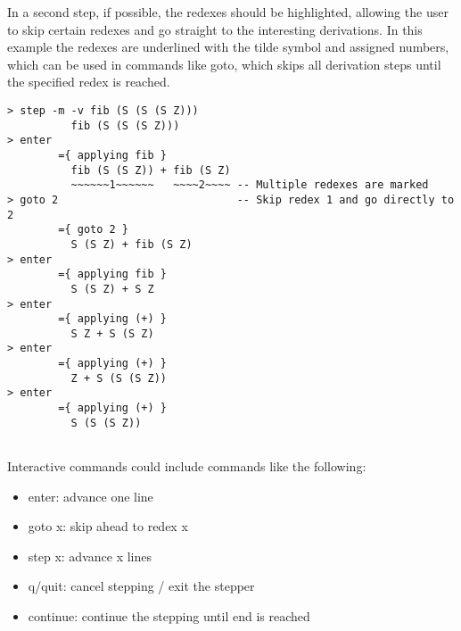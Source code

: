 In a second step, if possible, the redexes should be highlighted, allowing the user to skip certain redexes and go straight to the interesting derivations.
In this example the redexes are underlined with the tilde symbol and assigned numbers, which can be used in commands like goto, which skips all derivation steps until the specified redex is reached.

\begin{verbatim}
> step -m -v fib (S (S (S Z)))
          fib (S (S (S Z)))
> enter
        ={ applying fib }
          fib (S (S Z)) + fib (S Z)
          ~~~~~~1~~~~~~   ~~~~2~~~~ -- Multiple redexes are marked
> goto 2                            -- Skip redex 1 and go directly to 2
        ={ goto 2 }
          S (S Z) + fib (S Z)
> enter
        ={ applying fib }
          S (S Z) + S Z
> enter
        ={ applying (+) }
          S Z + S (S Z)
> enter
        ={ applying (+) }
          Z + S (S (S Z))
> enter
        ={ applying (+) }
          S (S (S Z))
          
\end{verbatim}

Interactive commands could include commands like the following:
\begin{itemize}
    \item enter: advance one line
    \item goto x: skip ahead to redex x
    \item step x: advance x lines
    \item q/quit: cancel stepping / exit the stepper
    \item continue: continue the stepping until end is reached
\end{itemize}